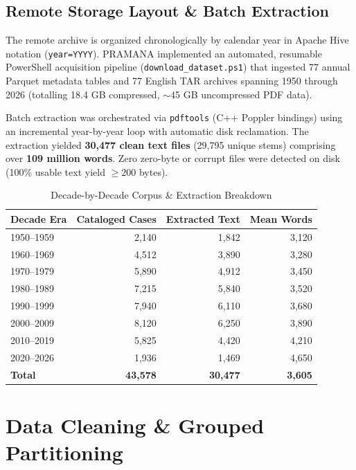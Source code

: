 \documentclass[journal,10pt,twocolumn]{IEEEtran}
\begin{document}
\subsection{Remote Storage Layout & Batch Extraction}
The remote archive is organized chronologically by calendar year in Apache Hive notation (\texttt{year=YYYY}). PRAMANA implemented an automated, resumable PowerShell acquisition pipeline (\texttt{download\_dataset.ps1}) that ingested 77 annual Parquet metadata tables and 77 English TAR archives spanning 1950 through 2026 (totalling 18.4 GB compressed, $\sim$45 GB uncompressed PDF data).

Batch extraction was orchestrated via \texttt{pdftools} (C++ Poppler bindings) using an incremental year-by-year loop with automatic disk reclamation. The extraction yielded \textbf{30,477 clean text files} (29,795 unique stems) comprising over \textbf{109 million words}. Zero zero-byte or corrupt files were detected on disk (100\% usable text yield $\ge 200$ bytes).

\begin{table}[t]
\caption{Decade-by-Decade Corpus & Extraction Breakdown}
\label{tab:corpus}
\centering
\begin{tabularx}{\columnwidth}{lrrr}
\toprule
\textbf{Decade Era} & \textbf{Cataloged Cases} & \textbf{Extracted Text} & \textbf{Mean Words} \\
\midrule
1950--1959 & 2,140 & 1,842 & 3,120 \\
1960--1969 & 4,512 & 3,890 & 3,280 \\
1970--1979 & 5,890 & 4,912 & 3,450 \\
1980--1989 & 7,215 & 5,840 & 3,520 \\
1990--1999 & 7,940 & 6,110 & 3,680 \\
2000--2009 & 8,120 & 6,250 & 3,890 \\
2010--2019 & 5,825 & 4,420 & 4,210 \\
2020--2026 & 1,936 & 1,469 & 4,650 \\
\midrule
\textbf{Total} & \textbf{43,578} & \textbf{30,477} & \textbf{3,605} \\
\bottomrule
\end{tabularx}
\end{table}

\section{Data Cleaning & Grouped Partitioning}
\end{document}
